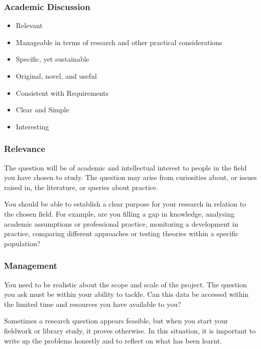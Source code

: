 \begin{frame}
	\frametitle{Academic Discussion}
		
	\begin{itemize}	
		\item Relevant
		\item Manageable in terms of research and other practical considerations
		\item Specific, yet sustainable
		\item Original, novel, and useful
		\item Consistent with Requirements
		\item Clear and Simple
		\item Interesting
	\end{itemize}
\end{frame}

\begin{frame}
	\frametitle{Relevance}
		
	The question will be of academic and intellectual interest to people in the field you have chosen to study. 
	The question may arise from curiosities about, or issues raised in, the literature, or queries about practice.

	\vspace{2em}

	You should be able to establish a clear purpose for your research in relation to the chosen field. 
	For example, are you filling a gap in knowledge, analysing academic assumptions or professional practice, 
	monitoring a development in practice, comparing different approaches or testing theories within a specific population?

\end{frame}

\begin{frame}
	\frametitle{Management}
		
	You need to be realistic about the scope and scale of the project. The question you ask must be within your ability to tackle. 
	Can this data be accessed within the limited time and resources you have available to you?
	
	\vspace{2em}
	
	Sometimes a research question appears feasible, but when you start your fieldwork or library study, it proves otherwise. 
	In this situation, it is important to write up the problems honestly and to reflect on what has been learnt.

\end{frame}


